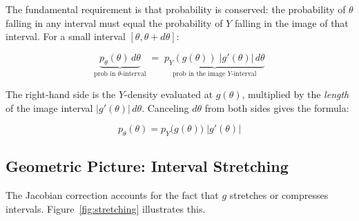 \documentclass[11pt,a4paper]{article}
\theoremstyle{definition}
\begin{document}
The fundamental requirement is that probability is conserved: the probability
of $\theta$ falling in any interval must equal the probability of $Y$ falling
in the image of that interval. For a small interval $[\theta, \theta + d\theta]$:

\begin{equation}
    \label{eq:prob_conservation}
    \underbrace{p_\theta(\theta) \, d\theta}_{\text{prob in } \theta\text{-interval}}
    \;=\;
    \underbrace{p_Y(g(\theta)) \; |g'(\theta)| \, d\theta}_{\text{prob in the image } Y\text{-interval}}
\end{equation}

The right-hand side is the $Y$-density evaluated at $g(\theta)$, multiplied by
the \emph{length} of the image interval $|g'(\theta)| \, d\theta$. Canceling
$d\theta$ from both sides gives the formula:

\begin{keyresult}
\begin{equation}
    \label{eq:1d_formula}
    p_\theta(\theta) = p_Y\!\big(g(\theta)\big) \; \big|g'(\theta)\big|
\end{equation}
\end{keyresult}

\subsection{Geometric Picture: Interval Stretching}

The Jacobian correction accounts for the fact that $g$ stretches or compresses
intervals. Figure~\ref{fig:stretching} illustrates this.
\end{document}
